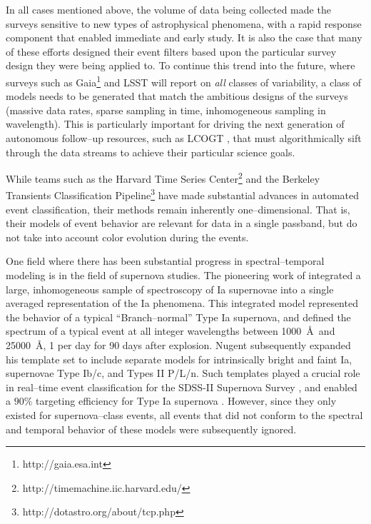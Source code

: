 In all cases mentioned above, the volume of data being collected made the
surveys sensitive to new types of astrophysical phenomena, with a rapid response
component that enabled immediate and early study.  It is also the case that many
of these efforts designed their event filters based upon the particular survey
design they were being applied to.  To continue this trend into the future,
where surveys such as Gaia\footnote{http://gaia.esa.int} and LSST will report on
{\it all} classes of variability, a class of models needs to be generated that
match the ambitious designs of the surveys (massive data rates, sparse sampling
in time, inhomogeneous sampling in wavelength).  This is particularly important
for driving the next generation of autonomous follow--up resources, such as
LCOGT \citep{2008AN....329..269H}, that must algorithmically sift through the
data streams to achieve their particular science goals.

 \smallskip

While teams such as the Harvard Time Series
Center\footnote{http://timemachine.iic.harvard.edu/} and the Berkeley Transients
Classification Pipeline\footnote{http://dotastro.org/about/tcp.php} have made
substantial advances in automated event classification, their methods remain
inherently one--dimensional. That is, their models of event behavior are
relevant for data in a single passband, but do not take into account color
evolution during the events.

One field where there has been substantial progress in spectral--temporal
modeling is in the field of supernova studies. The pioneering work of
\cite{2002PASP..114..803N} integrated a large, inhomogeneous sample of
spectroscopy of Ia supernovae into a single averaged representation of the Ia
phenomena. This integrated model represented the behavior of a typical
``Branch--normal'' Type Ia supernova, and defined the spectrum of a typical event
at all integer wavelengths between 1000~\AA~and 25000~\AA, 1 per day for 90 days
after explosion.  Nugent subsequently expanded his template set to include
separate models for intrinsically bright and faint Ia, supernovae Type Ib/c, and
Types II P/L/n. Such templates played a crucial role in real--time event
classification for the SDSS-II Supernova Survey \citep{2008AJ....135..338F}, and
enabled a $90\%$ targeting efficiency for Type Ia supernova
\citep{2008AJ....135..348S}. However, since they only existed for
supernova--class events, all events that did not conform to the spectral and
temporal behavior of these models were subsequently ignored.

